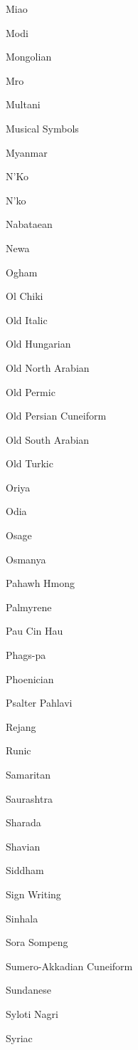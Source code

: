 \begin{table}[!hbp]
\begin{multicols}{4}
    Miao \par
    Modi \par
    Mongolian \par
    Mro \par
    Multani \par
    Musical Symbols \par
    Myanmar \par
    \dup N'Ko \par
    \dup N'ko \par
    Nabataean \par
    Newa \par
    Ogham \par
    Ol Chiki \par
    Old Italic \par
    Old Hungarian \par
    Old North Arabian \par
    Old Permic \par
    Old Persian Cuneiform \par
    Old South Arabian \par
    Old Turkic \par
    \dup Oriya \par
    \dup Odia \par
    Osage \par
    Osmanya \par
    Pahawh Hmong \par
    Palmyrene \par
    Pau Cin Hau \par
    Phags-pa \par
    Phoenician \par
    Psalter Pahlavi \par
    Rejang \par
    Runic \par
    Samaritan \par
    Saurashtra \par
    Sharada \par
    Shavian \par
    Siddham \par
    Sign Writing \par
    Sinhala \par
    Sora Sompeng \par
    Sumero-Akkadian Cuneiform \par
    Sundanese \par
    Syloti Nagri \par
    Syriac \par

\end{multicols}
\end{table}
